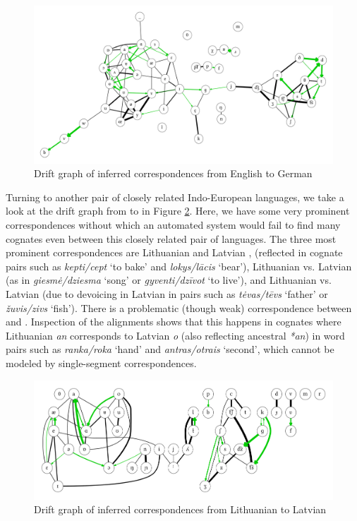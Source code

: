 \begin{figure}[h!]
    \includegraphics[width=\textwidth]{figures/drift-graph-en-de.pdf}
    \caption{Drift graph of inferred correspondences from English to German}
    \label{fig:driftGraphEnDe}
\end{figure}

Turning to another pair of closely related Indo-European languages, we take a look at the drift graph from  to  in Figure \ref{fig:driftGraphLtLv}. Here, we have some very prominent correspondences without which an automated system would fail to find many cognates even between this closely related pair of languages. The three most prominent correspondences are Lithuanian \ipa{[k]} and Latvian \ipa{[\t{ts}]}, (reflected in cognate pairs such as \textit{kepti/cept} `to bake' and \textit{lokys/l\={a}cis} `bear'), Lithuanian \ipa{[g]} vs. Latvian \ipa{[\t{dz}]} (as in \textit{giesm\.{e}/dziesma} `song' or \textit{gyventi/dz\=ivot} `to live'), and Lithuanian \ipa{[V]} vs. Latvian \ipa{[f]} (due to devoicing in Latvian in pairs such as \textit{t\.{e}vas/t\={e}vs} `father' or \textit{\v{z}uvis/zivs} `fish'). There is a problematic (though weak) correspondence between \ipa{[n]} and \ipa{[O]}. Inspection of the alignments shows that this happens in cognates where Lithuanian \textit{an} \ipa{[5n]} corresponds to Latvian \textit{o} \ipa{[uO]} (also reflecting ancestral \textit{*an}) in word pairs such as \textit{ranka/roka} `hand' and \textit{antras/otrais} `second', which cannot be modeled by single-segment correspondences.

\begin{figure}[h!]
    \includegraphics[width=\textwidth]{figures/drift-graph-lt-lv.pdf}
    \caption{Drift graph of inferred correspondences from Lithuanian to Latvian}
    \label{fig:driftGraphLtLv}
\end{figure}

